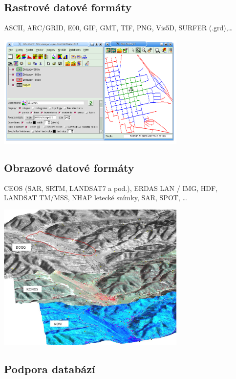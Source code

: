 \documentclass[notumble,a4paper,10pt,nofoldmark]{leaflet}
\newenvironment{myfig}[1][0pt plus 1.5ex minus
.5ex]{\par\vspace*{#1}\begin{minipage}{\textwidth}\centering}{\end{minipage}}
\begin{document}
\subsection{Rastrové datové formáty}
ASCII, ARC/GRID, E00, GIF, GMT, TIF, PNG, Vis5D, SURFER (.grd),\dots
\begin{myfig}
\includegraphics[width=0.7\textwidth]{isodist}
\end{myfig}

\subsection{Obrazové datové formáty}

CEOS (SAR, SRTM, LANDSAT7 a pod.), ERDAS LAN / IMG, HDF, LANDSAT
TM/MSS, NHAP letecké snímky, SAR, SPOT, \dots
\begin{myfig}[1.5ex]
\includegraphics[width=0.7\textwidth]{ndvi}
\end{myfig}

\subsection{Podpora databází}
\end{document}

